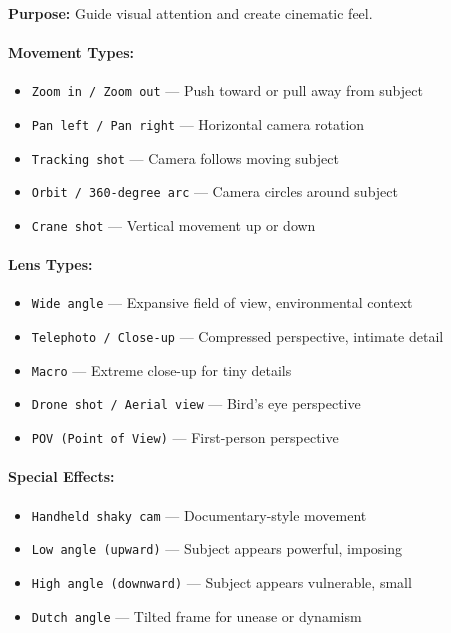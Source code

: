 \textbf{Purpose:} Guide visual attention and create cinematic feel.

\paragraph{Movement Types:}
\begin{itemize}
    \item \texttt{Zoom in / Zoom out} --- Push toward or pull away from subject
    \item \texttt{Pan left / Pan right} --- Horizontal camera rotation
    \item \texttt{Tracking shot} --- Camera follows moving subject
    \item \texttt{Orbit / 360-degree arc} --- Camera circles around subject
    \item \texttt{Crane shot} --- Vertical movement up or down
\end{itemize}

\paragraph{Lens Types:}
\begin{itemize}
    \item \texttt{Wide angle} --- Expansive field of view, environmental context
    \item \texttt{Telephoto / Close-up} --- Compressed perspective, intimate detail
    \item \texttt{Macro} --- Extreme close-up for tiny details
    \item \texttt{Drone shot / Aerial view} --- Bird's eye perspective
    \item \texttt{POV (Point of View)} --- First-person perspective
\end{itemize}

\paragraph{Special Effects:}
\begin{itemize}
    \item \texttt{Handheld shaky cam} --- Documentary-style movement
    \item \texttt{Low angle (upward)} --- Subject appears powerful, imposing
    \item \texttt{High angle (downward)} --- Subject appears vulnerable, small
    \item \texttt{Dutch angle} --- Tilted frame for unease or dynamism
\end{itemize}

